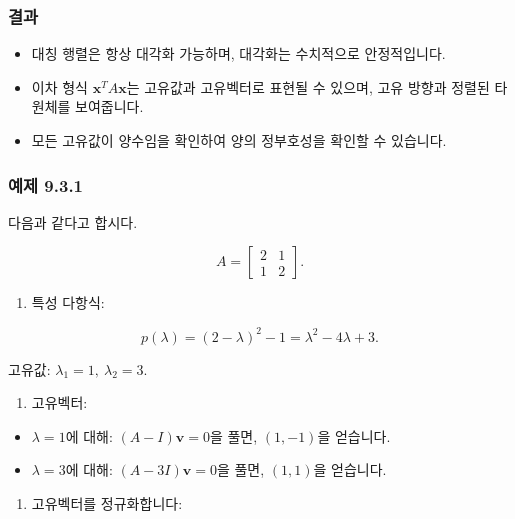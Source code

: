\documentclass[
  12pt,
  a4paper,
]{article}
\begin{document}
\subsubsection{결과}\label{consequences}

\begin{itemize}
\item
  대칭 행렬은 항상 대각화 가능하며, 대각화는 수치적으로 안정적입니다.
\item
  이차 형식 \(\mathbf{x}^T A \mathbf{x}\)는 고유값과 고유벡터로 표현될 수 있으며, 고유 방향과 정렬된 타원체를 보여줍니다.
\item
  모든 고유값이 양수임을 확인하여 양의 정부호성을 확인할 수 있습니다.
\end{itemize}

\subsubsection{예제 9.3.1}\label{example-931}

다음과 같다고 합시다.

\[A = \begin{bmatrix}
2 & 1 \\
1 & 2 \end{bmatrix}.\]

\begin{enumerate}
\def\labelenumi{\arabic{enumi}.}
\item
  특성 다항식:
\end{enumerate}

\[p(\lambda) = (2-\lambda)^2 - 1 = \lambda^2 - 4\lambda + 3.\]

고유값: \(\lambda_1 = 1, \ \lambda_2 = 3\).

\begin{enumerate}
\def\labelenumi{\arabic{enumi}.}
\item
  고유벡터:
\end{enumerate}

\begin{itemize}
\item
  \(\lambda=1\)에 대해: \((A-I)\mathbf{v} = 0\)을 풀면, \((1,-1)\)을 얻습니다.
\item
  \(\lambda=3\)에 대해: \((A-3I)\mathbf{v} = 0\)을 풀면, \((1,1)\)을 얻습니다.
\end{itemize}

\begin{enumerate}
\def\labelenumi{\arabic{enumi}.}
\item
  고유벡터를 정규화합니다:
\end{enumerate}
\end{document}
